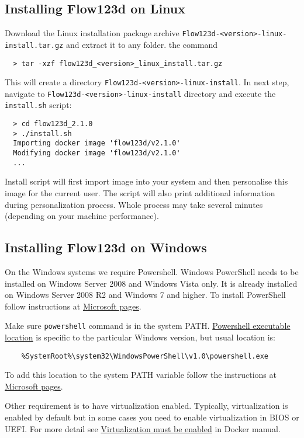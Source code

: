 \documentclass[12pt,a4paper]{report}
\begin{document}
\subsection{Installing Flow123d on Linux}
Download the Linux installation package archive \verb'Flow123d-<version>-linux-install.tar.gz' and extract it to any folder.
the command
\begin{verbatim}
  > tar -xzf flow123d_<version>_linux_install.tar.gz 
\end{verbatim}
This will create a directory \verb'Flow123d-<version>-linux-install'. In next step, navigate to \verb'Flow123d-<version>-linux-install' directory
and execute the \verb'install.sh' script:
\begin{verbatim}
  > cd flow123d_2.1.0
  > ./install.sh
  Importing docker image 'flow123d/v2.1.0'
  Modifying docker image 'flow123d/v2.1.0'
  ...
\end{verbatim}
Install script will first import image into your system and then personalise this image for the current user. The script will also print
additional information during personalization process. Whole process may take several minutes (depending on your machine performance).


\subsection{Installing Flow123d on Windows}
On the Windows systems we require Powershell. Windows PowerShell needs to be installed on Windows Server 2008 and Windows Vista only.
It is already installed on Windows Server 2008 R2 and Windows 7 and higher. To install PowerShell follow instructions at
\href{https://msdn.microsoft.com/en-us/powershell/scripting/setup/installing-windows-powershell}{Microsoft pages}.

Make sure \verb'powershell' command is in the system PATH. 
\href{http://www.powershelladmin.com/wiki/PowerShell_Executables_File_System_Locations}{Powershell executable location}
 is specific to the particular Windows version, but usual location is:
 \begin{verbatim}
    %SystemRoot%\system32\WindowsPowerShell\v1.0\powershell.exe  
 \end{verbatim}
 To add this location to the system PATH variable follow the instructions at
 \href{https://msdn.microsoft.com/en-us/library/office/ee537574(v=office.14).aspx}{Microsoft pages}.

Other requirement is to have virtualization enabled. Typically, virtualization is enabled by default but in some
cases you need to enable virtualization in BIOS or UEFI. For more detail see 
\href{https://docs.docker.com/docker-for-windows/troubleshoot/#virtualization-must-be-enabled}{Virtualization must be enabled} in Docker manual.
\end{document}
